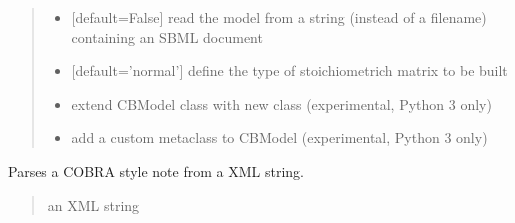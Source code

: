 \documentclass[letterpaper,12pt,english]{sphinxmanual}
\begin{document}
\begin{fulllineitems}
\begin{quote}
\begin{description}
\begin{itemize}
\item {} 
\sphinxAtStartPar
{} \textendash{} {[}default=False{]} read the model from a string (instead of a filename) containing an SBML document

\item {} 
\sphinxAtStartPar
{} \textendash{} {[}default=’normal’{]} define the type of stoichiometrich matrix to be built

\item {} 
\sphinxAtStartPar
{} \textendash{} extend CBModel class with new class (experimental, Python 3 only)

\item {} 
\sphinxAtStartPar
{} \textendash{} add a custom metaclass to CBModel (experimental, Python 3 only)

\end{itemize}

\end{description}\end{quote}

\end{fulllineitems}


\begin{fulllineitems}
\label{\detokenize{api/io:cbmpy.CBXML.sbml_readCOBRANote}}
\pysigstartsignatures
\pysiglinewithargsret
{}
{}
{}
\pysigstopsignatures
\sphinxAtStartPar
Parses a COBRA style note from a XML string.
\begin{quote}\begin{description}
\sphinxAtStartPar
{} \textendash{} an XML string

\end{description}\end{quote}

\end{fulllineitems}

\end{document}
